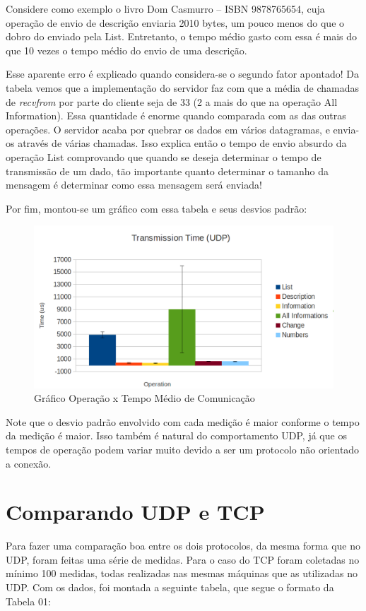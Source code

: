\documentclass[10pt,a4paper]{report}
\begin{document}
	Considere como exemplo o livro Dom Casmurro – ISBN 9878765654, cuja operação de envio de descrição enviaria 2010 bytes, um pouco menos do que o dobro do enviado pela List. Entretanto, o tempo médio gasto com essa é mais do que 10 vezes o tempo médio do envio de uma descrição.
	
	Esse aparente erro é explicado quando considera-se o segundo fator apontado! Da tabela vemos que a implementação do servidor faz com que a média de chamadas de \textit{recvfrom} por parte do cliente seja de 33 (2 a mais do que na operação All Information). Essa quantidade é enorme quando comparada com as das outras operações. O servidor acaba por quebrar os dados em vários datagramas, e envia-os através de várias chamadas. Isso explica então o tempo de envio absurdo da operação List comprovando que quando se deseja determinar o tempo de transmissão de um dado, tão importante quanto determinar o tamanho da mensagem é determinar como essa mensagem será enviada!
	

	Por fim, montou-se um gráfico com essa tabela e seus desvios padrão:
	
\begin{figure}[h!]
\includegraphics[width=\textwidth]{Imagens/udp.png}
\caption{Gráfico Operação x Tempo Médio de Comunicação}
\end{figure}
	
	Note que o desvio padrão envolvido com cada medição é maior conforme o tempo da medição é maior. Isso também é natural do comportamento UDP, já que os tempos de operação podem variar muito devido a ser um protocolo não orientado a conexão.
	
\newpage
\section{Comparando UDP e TCP}
Para fazer uma comparação boa entre os dois protocolos, da mesma forma que no UDP, foram feitas uma série de medidas. Para o caso do TCP foram coletadas no mínimo 100 medidas, todas realizadas nas mesmas máquinas que as utilizadas no UDP.
	Com os dados, foi montada a seguinte tabela, que segue o formato da Tabela 01:
	
\end{document}
